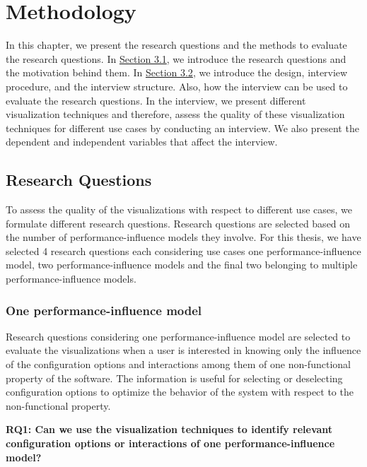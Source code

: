 \chapter{Methodology}
\label{methodology}

In this chapter, we present the research questions and the methods to evaluate the research questions. In \hyperref[sec:3.1]{Section 3.1}, we introduce the research questions and the motivation behind them. In \hyperref[sec:3.2]{Section 3.2}, we introduce the design, interview procedure, and the interview structure.  Also, how the interview can be used to evaluate the research questions. In the interview, we present different visualization techniques and therefore, assess the quality of these visualization techniques for different use cases by conducting an interview. We also present the dependent and independent variables that affect the interview.

\section{Research Questions}
\label{sec:3.1}
To assess the quality of the visualizations with respect to different use cases, we formulate different research questions. Research questions are selected based on the number of performance-influence models they involve. For this thesis, we have selected 4 research questions each considering use cases one performance-influence model, two performance-influence models and the final two belonging to multiple performance-influence models. 

\subsection{One performance-influence model}

Research questions considering one performance-influence model are selected to evaluate the visualizations when a user is interested in knowing only the influence of the configuration options and interactions among them of one non-functional property of the software.
The information is useful for selecting or deselecting configuration options to optimize the behavior of the system with respect to the non-functional property. 

\begin{mdframed}
\textbf{RQ1: Can we use the visualization techniques to identify relevant configuration options or interactions of one performance-influence model?}
\end{mdframed}

